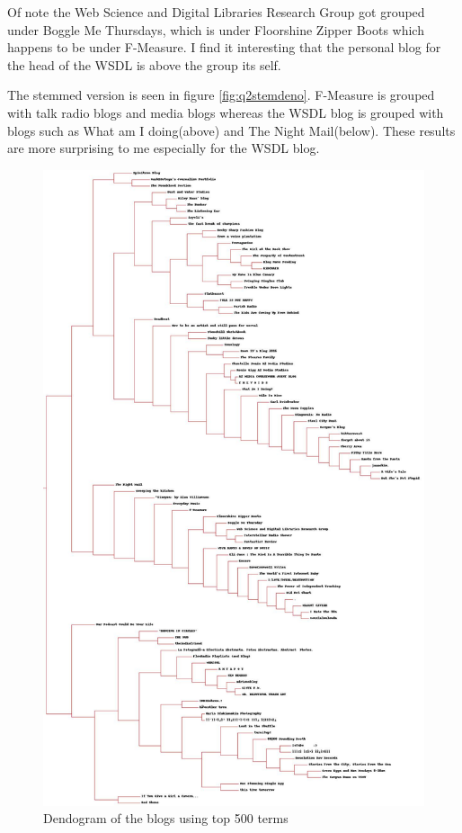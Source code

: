 \documentclass[letterpaper,10pt]{article}
\begin{document}
Of note the Web Science and Digital Libraries Research Group got grouped under Boggle Me Thursdays, which is under Floorshine Zipper Boots which happens to be under F-Measure. I find it interesting that the personal blog for the head of the WSDL is above the group its self.

The stemmed version is seen in figure \hyperref[fig:q2stemdeno]{\ref{fig:q2stemdeno}}. F-Measure is grouped with talk radio blogs and media blogs whereas the WSDL blog is grouped with blogs such as What am I doing(above) and The Night Mail(below). These results are more surprising to me especially for the WSDL blog.

\newpage
\begin{figure}[h]
\includegraphics[scale=0.26]{datafiles/blogtop500_deno.jpg}
\caption{Dendogram of the blogs using top 500 terms}
\label{fig:q2deno}
\end{figure}
\end{document}
